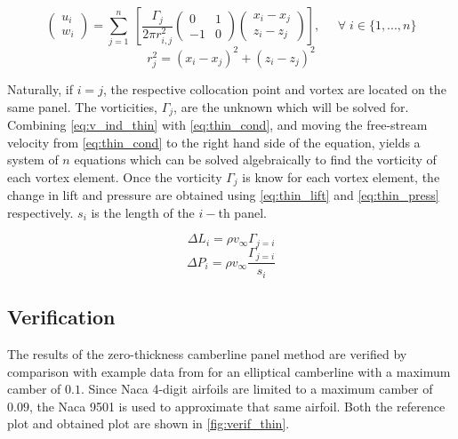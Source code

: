 \begin{equation}
\label{eq:v_ind_thin}
    \left(\begin{array}{l}
    u_i \\ w_i
    \end{array}\right)
    =
    \sum_{j=1}^{n} \:
    \left[ \frac{\Gamma_{j}}{2 \pi r_{i,j}^{2}}
    \left(\begin{array}{cc}
    0 & 1 \\ -1 & 0
    \end{array}\right)
    \left(\begin{array}{l}
    x_i-x_{j} \\ z_i-z_{j}
    \end{array}\right) \right], \; \; \; \; \; \forall \; i \in \{1,...,n\}
\end{equation}
\begin{equation}r_{j}^{2}=\left(x_i-x_j\right)^{2}+\left(z_i-z_j\right)^{2}\end{equation}
\medskip

Naturally, if $i=j$, the respective collocation point and vortex are located
on the same panel. The vorticities, $\Gamma_j$, are the unknown which will be solved for.
Combining \autoref{eq:v_ind_thin} with \autoref{eq:thin_cond}, and moving the free-stream
velocity from \autoref{eq:thin_cond} to the right hand side of the equation,  yields a
system of $n$ equations which can be solved algebraically to find the vorticity of each vortex element.
Once the vorticity $\Gamma_j$ is know for each vortex element, the change in lift and
pressure are obtained using \autoref{eq:thin_lift} and \autoref{eq:thin_press} respectively.
 $s_i$ is the length of the $i-$th panel.

\begin{equation}
\label{eq:thin_lift}
\Delta L_i = \rho v_\infty \Gamma_{j=i}
\end{equation}
\begin{equation}
\label{eq:thin_press}
\Delta P_i = \rho v_\infty \frac{\Gamma_{j=i}}{s_i}
\end{equation}

\subsection{Verification}
The results of the zero-thickness camberline panel method are verified by
comparison with example data from \citeauthor{katz_plotkin} for an elliptical
camberline with a maximum camber of $0.1$. Since Naca 4-digit airfoils are
limited to a maximum camber of $0.09$, the Naca 9501 is used to approximate that
same airfoil. Both the reference plot and obtained plot are shown in \autoref{fig:verif_thin}.

